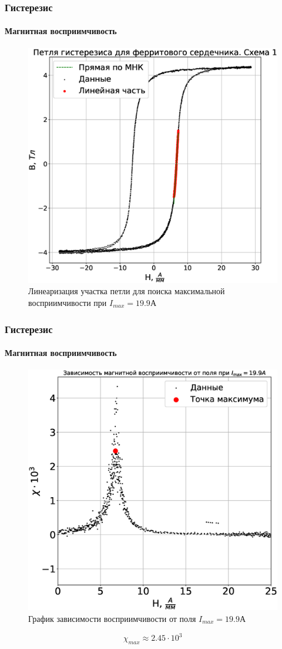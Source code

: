 \documentclass[8pt,pdf,hyperref={unicode}]{beamer}
\begin{document}
	\begin{frame}
		\frametitle{Гистерезис}
		\framesubtitle{Магнитная восприимчивость}
		\begin{center}
			\begin{figure}[h!]
				\centering
				\includegraphics[width=.5\linewidth]{Lab2_8.eps}
				\caption{Линеаризация участка петли для поиска максимальной восприимчивости при $I_{max} = 19.9$А}
				\label{fig:3}
			\end{figure}
		\end{center}
	\end{frame}
	
	\begin{frame}
		\frametitle{Гистерезис}
		\framesubtitle{Магнитная восприимчивость}
		\begin{center}
			\begin{figure}[h!]
				\centering
				\includegraphics[width=.45\linewidth]{Lab2_9.eps}
				\caption{График зависимости восприимчивости от поля $I_{max} = 19.9$А}
				\label{fig:3}
			\end{figure}
			\begin{equation}
			\chi_{max} \approx 2.45 \cdot 10^3
			\end{equation}
		\end{center}
	\end{frame}
\end{document}
